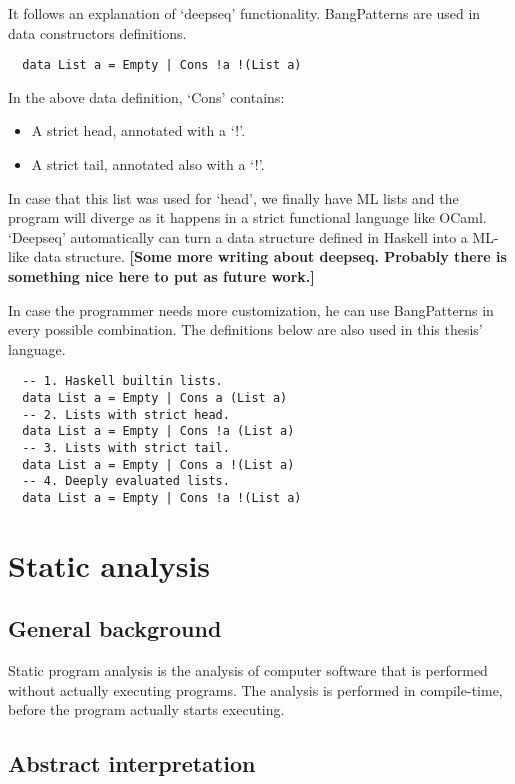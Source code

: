 \documentclass[diploma]{softlab-thesis}
\begin{document}
It follows an explanation of `deepseq' functionality. 
BangPatterns are used in data constructors definitions.

\begin{verbatim}
  data List a = Empty | Cons !a !(List a)
\end{verbatim}

In the above data definition, `Cons' contains:
\begin{itemize}
  \item A strict head, annotated with a `!'.
  \item A strict tail, annotated also with a `!'.
\end{itemize}

In case that this list was used for `head', we finally have ML lists and the program 
will diverge as it happens in a strict functional language like OCaml. `Deepseq' automatically can turn a data structure
defined in Haskell into a ML-like data structure. \textbf{[Some more writing about deepseq. Probably there is something nice 
here to put as future work.]}
\newline \newline
\par In case the programmer needs more customization, he can use BangPatterns in every possible combination. 
The definitions below are also used in this thesis' language.
\begin{verbatim}
  -- 1. Haskell builtin lists.
  data List a = Empty | Cons a (List a) 
  -- 2. Lists with strict head.
  data List a = Empty | Cons !a (List a)
  -- 3. Lists with strict tail.
  data List a = Empty | Cons a !(List a)
  -- 4. Deeply evaluated lists. 
  data List a = Empty | Cons !a !(List a)
\end{verbatim}

\section {Static analysis}

\subsection{General background}

Static program analysis is the analysis of computer software that is performed without actually executing programs.
The analysis is performed in compile-time, before the program actually starts executing. 

\subsection{Abstract interpretation}
\end{document}
